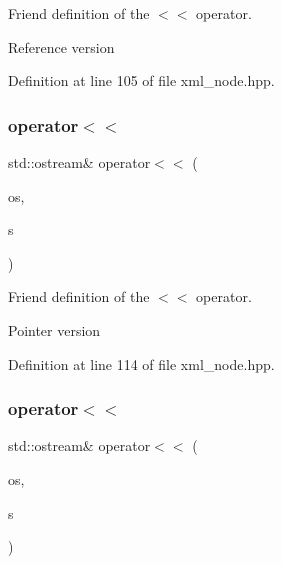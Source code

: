 Friend definition of the $<$$<$ operator. 

Reference version 

Definition at line 105 of file xml\+\_\+node.\+hpp.

\mbox{\label{classxml__node_af77e55c29cc5e64eab6fe374312e2443}} 
\subsubsection{\texorpdfstring{operator$<$$<$}{operator<<}\hspace{0.1cm}{\footnotesize\ttfamily [2/3]}}
{\footnotesize\ttfamily std\+::ostream\& operator$<$$<$ (\begin{DoxyParamCaption}\item[{std\+::ostream \&}]{os,  }\item[{const \hyperlink{classxml__node}{xml\+\_\+node} $\ast$}]{s }\end{DoxyParamCaption})\hspace{0.3cm}{\ttfamily [friend]}}



Friend definition of the $<$$<$ operator. 

Pointer version 

Definition at line 114 of file xml\+\_\+node.\+hpp.

\mbox{\label{classxml__node_a3acaf27c268e55db5cd8dac82ccc8389}} 
\subsubsection{\texorpdfstring{operator$<$$<$}{operator<<}\hspace{0.1cm}{\footnotesize\ttfamily [3/3]}}
{\footnotesize\ttfamily std\+::ostream\& operator$<$$<$ (\begin{DoxyParamCaption}\item[{std\+::ostream \&}]{os,  }\item[{const xml\+\_\+node\+Ref \&}]{s }\end{DoxyParamCaption})\hspace{0.3cm}{\ttfamily [friend]}}



